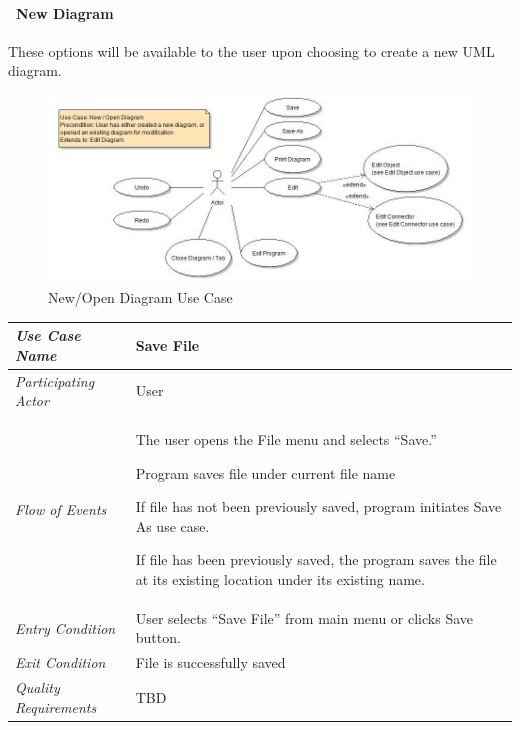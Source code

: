 \documentclass[twoside,letterpaper]{article}
\newenvironment{my_enumerate}{
\begin{enumerate}
  \setlength{\itemsep}{1pt}
  \setlength{\parskip}{0pt}
  \setlength{\parsep}{0pt}}{\end{enumerate}
}
\begin{document}
\paragraph[\ Use Category]
{\ New Diagram} {These options will be available to the user upon choosing to create a new UML diagram.}

\begin{figure}[h]
\centering
\includegraphics[width=6.0in]{ucaseNewOpenDiagram.jpg}
\caption{New/Open Diagram Use Case}
\end{figure}

\begin{flushleft}
\tablehead{}
\begin{tabular}{|m{2.0in} m{5.0in}|}
\hline
{\bfseries\emph{Use Case Name}}
& {\bfseries Save File}
\\\hline
\emph{Participating Actor}
& User
\\\hline
\emph{Flow of Events}
& \begin{my_enumerate}
  \item The user opens the File menu and selects ``Save.''
  \item Program saves file under current file name 
\begin{my_enumerate}
\item If file has not been previously saved, program initiates Save As use case. 
\item If file has been previously saved, the program saves the file at its existing location under its existing name.
\end{my_enumerate}
\end{my_enumerate}
\\\hline
\emph{Entry Condition}
& User selects ``Save File'' from main menu or clicks Save button.
\\\hline
\emph{Exit Condition}
& File is successfully saved
\\\hline
\emph{Quality Requirements}
& TBD
\\\hline
\end{tabular}
\end{flushleft}
\bigskip
\end{document}
